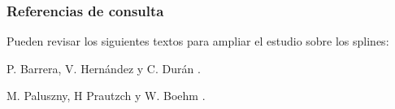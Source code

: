 \begin{frame}
\frametitle{Referencias de consulta}
Pueden revisar los siguientes textos para ampliar el estudio sobre los splines:
\begin{thebibliography}{10}
\alert{P. Barrera, V. Hernández y C. Durán}
.

\alert{M. Paluszny, H Prautzch y W. Boehm}
.
\end{thebibliography}
\end{frame}
